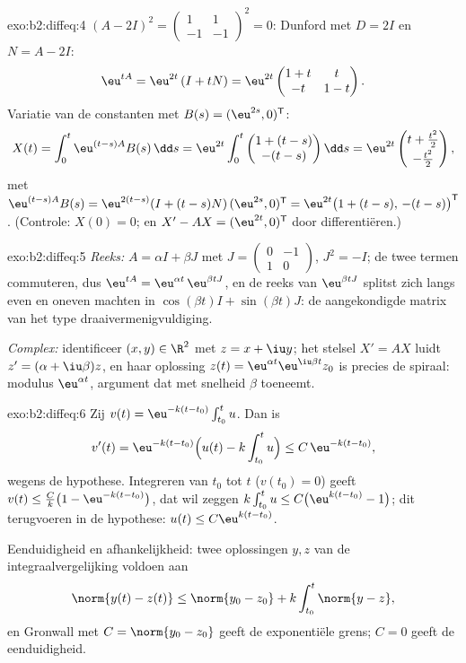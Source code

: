 \begin{solution}{exo:b2:diffeq:4}
$(A - 2I)^2 = \begin{pmatrix}1 & 1\\ -1 & -1\end{pmatrix}^2 = 0$:
Dunford met $D = 2I$ en $N = A - 2I$:
\[
\eu^{tA} = \eu^{2t}\,(I + tN)
= \eu^{2t}\begin{pmatrix} 1 + t & t\\ -t & 1 - t\end{pmatrix}.
\]
Variatie van de constanten met $B(s) = (\eu^{2s}, 0)^{\mathsf T}$:
\[
X(t) = \int_0^t \eu^{(t-s)A}B(s)\,\dd s
= \eu^{2t}\int_0^t \begin{pmatrix} 1 + (t-s)\\ -(t-s)
\end{pmatrix}\dd s
= \eu^{2t}\begin{pmatrix} t + \frac{t^2}{2}\\[2pt] -\frac{t^2}{2}
\end{pmatrix},
\]
met $\eu^{(t-s)A}B(s) = \eu^{2(t-s)}(I + (t-s)N)\,(\eu^{2s},
0)^{\mathsf T} = \eu^{2t}\bigl(1 + (t-s),\, -(t-s)\bigr)^{\mathsf
T}$. (Controle: $X(0) = 0$; en $X' - AX = (\eu^{2t}, 0)^{\mathsf
T}$ door differentiëren.)
\end{solution}

\begin{solution}{exo:b2:diffeq:5}
\emph{Reeks:} $A = \alpha I + \beta J$ met $J = \begin{pmatrix}0 &
-1\\ 1 & 0\end{pmatrix}$, $J^2 = -I$; de twee termen commuteren,
dus $\eu^{tA} = \eu^{\alpha t}\,\eu^{\beta tJ}$, en de reeks van
$\eu^{\beta t J}$ splitst zich langs even en oneven machten in
$\cos(\beta t)I + \sin(\beta t)J$: de aangekondigde matrix van het
type draaivermenigvuldiging.

\emph{Complex:} identificeer $(x, y) \in \R^2$ met $z = x + \iu y$;
het stelsel $X' = AX$ luidt $z' = (\alpha + \iu\beta)z$, en haar
oplossing $z(t) = \eu^{\alpha t}\eu^{\iu\beta t}z_0$ is precies de
spiraal: modulus $\eu^{\alpha t}$, argument dat met snelheid
$\beta$ toeneemt.
\end{solution}

\begin{solution}{exo:b2:diffeq:6}
Zij $v(t) = \eu^{-k(t - t_0)}\int_{t_0}^t u$. Dan is
\[
v'(t) = \eu^{-k(t-t_0)}\Bigl(u(t) - k\int_{t_0}^t u\Bigr)
\leq C\,\eu^{-k(t-t_0)},
\]
wegens de hypothese. Integreren van $t_0$ tot $t$ ($v(t_0) = 0$)
geeft $v(t) \leq \frac{C}{k}\bigl(1 - \eu^{-k(t - t_0)}\bigr)$, dat
wil zeggen $k\int_{t_0}^t u \leq C\bigl(\eu^{k(t-t_0)} - 1\bigr)$;
dit terugvoeren in de hypothese: $u(t) \leq C\eu^{k(t-t_0)}$.

Eenduidigheid en afhankelijkheid: twee oplossingen $y, z$ van de
integraalvergelijking voldoen aan
\[
\norm{y(t) - z(t)} \leq \norm{y_0 - z_0} +
k\int_{t_0}^{t}\norm{y - z},
\]
en Gronwall met $C = \norm{y_0 - z_0}$ geeft de exponentiële
grens; $C = 0$ geeft de eenduidigheid.
\end{solution}

